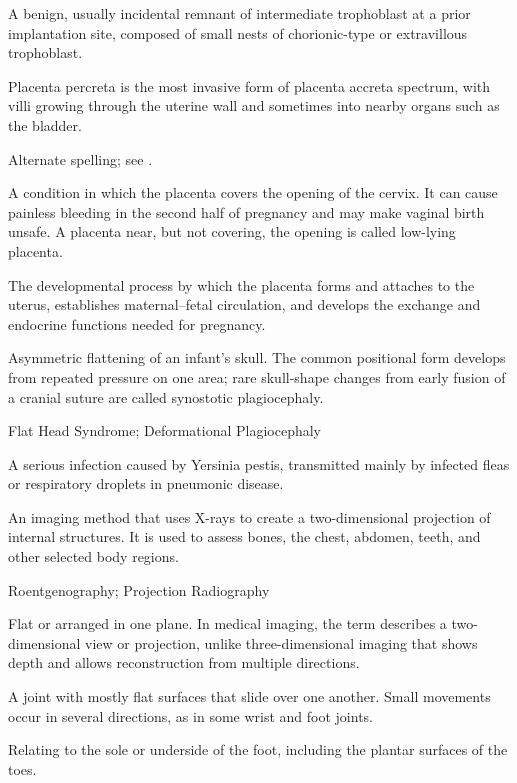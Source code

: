  A benign, usually incidental remnant of intermediate trophoblast at a prior implantation site, composed of small nests of chorionic-type or extravillous trophoblast.

 Placenta percreta is the most invasive form of placenta accreta spectrum, with villi growing through the uterine wall and sometimes into nearby organs such as the bladder.

 Alternate spelling; see .

 A condition in which the placenta covers the opening of the cervix. It can cause painless bleeding in the second half of pregnancy and may make vaginal birth unsafe. A placenta near, but not covering, the opening is called low-lying placenta.

 The developmental process by which the placenta forms and attaches to the uterus, establishes maternal--fetal circulation, and develops the exchange and endocrine functions needed for pregnancy.

 Asymmetric flattening of an infant’s skull. The common positional form develops from repeated pressure on one area; rare skull-shape changes from early fusion of a cranial suture are called synostotic plagiocephaly.

\synonyms
Flat Head Syndrome; Deformational Plagiocephaly

 A serious infection caused by Yersinia pestis, transmitted mainly by infected fleas or respiratory droplets in pneumonic disease.

 An imaging method that uses X-rays to create a two-dimensional projection of internal
structures. It is used to assess bones, the chest, abdomen, teeth, and other selected body regions.

\synonyms
Roentgenography; Projection Radiography

 Flat or arranged in one plane. In medical imaging, the term describes a two-dimensional view or projection, unlike three-dimensional imaging that shows depth and allows reconstruction from multiple directions.

 A joint with mostly flat surfaces that slide over one another. Small movements occur in several directions, as in some wrist and foot joints.

 Relating to the sole or underside of the foot, including the plantar surfaces of the toes.

